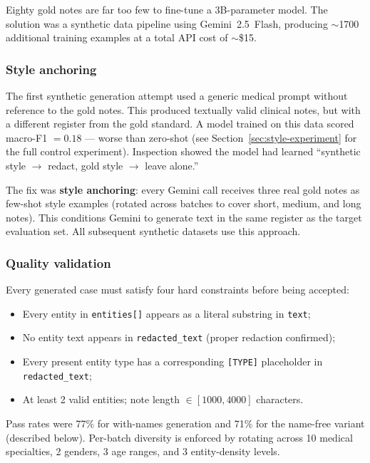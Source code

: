 \documentclass[11pt,a4paper]{article}
\begin{document}
Eighty gold notes are far too few to fine-tune a 3B-parameter model. The solution was a synthetic data pipeline using Gemini~2.5~Flash, producing $\sim$1700 additional training examples at a total API cost of $\sim$\$15.

\subsubsection{Style anchoring}

The first synthetic generation attempt used a generic medical prompt without reference to the gold notes. This produced textually valid clinical notes, but with a different register from the gold standard. A model trained on this data scored macro-F1 $= 0.18$ — worse than zero-shot (see Section~\ref{sec:style-experiment} for the full control experiment). Inspection showed the model had learned ``synthetic style $\to$ redact, gold style $\to$ leave alone.''

The fix was \textbf{style anchoring}: every Gemini call receives three real gold notes as few-shot style examples (rotated across batches to cover short, medium, and long notes). This conditions Gemini to generate text in the same register as the target evaluation set. All subsequent synthetic datasets use this approach.

\subsubsection{Quality validation}

Every generated case must satisfy four hard constraints before being accepted:
\begin{itemize}[leftmargin=*,topsep=2pt,itemsep=0pt]
  \item Every entity in \texttt{entities[]} appears as a literal substring in \texttt{text};
  \item No entity text appears in \texttt{redacted\_text} (proper redaction confirmed);
  \item Every present entity type has a corresponding \texttt{[TYPE]} placeholder in \texttt{redacted\_text};
  \item At least 2 valid entities; note length $\in [1000, 4000]$ characters.
\end{itemize}
Pass rates were 77\% for with-names generation and 71\% for the name-free variant (described below). Per-batch diversity is enforced by rotating across 10 medical specialties, 2 genders, 3 age ranges, and 3 entity-density levels.
\end{document}
